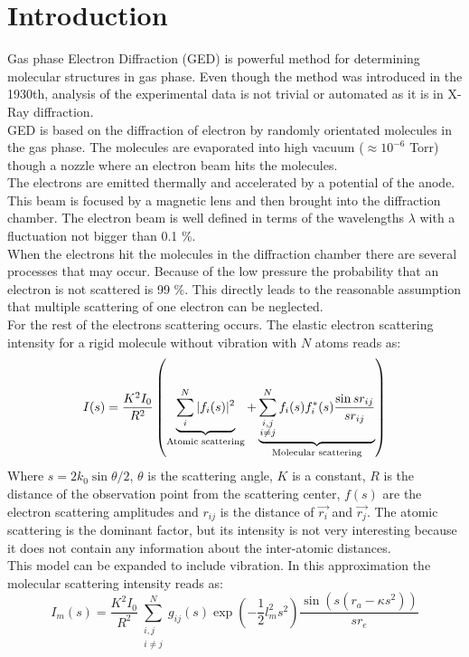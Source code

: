 \section{Introduction}
Gas phase Electron Diffraction  (GED) is powerful method for determining molecular structures in gas phase. Even though the method  was introduced in the 1930th, analysis of the experimental data is not trivial or automated as it is in X-Ray diffraction.\\ 
GED is based on the diffraction of electron by randomly orientated molecules in the gas phase. The molecules are evaporated into high vacuum ($\approx 10^{-6}$ Torr) though a nozzle where an electron beam hits the molecules.\\
The electrons are emitted thermally and accelerated by a potential of the anode.  This beam is focused by a magnetic lens and then brought into the diffraction chamber. The electron beam is well defined in terms of the wavelengths $\lambda$ with a fluctuation not bigger than 0.1 \%. \\
When the electrons hit the molecules in the diffraction chamber there are several processes that may occur. Because of the low pressure the probability that an electron is not scattered is 99 \%. This directly leads to the reasonable assumption that multiple scattering of one electron can be neglected. \\
For the rest of the electrons scattering occurs. The elastic electron scattering intensity for a rigid molecule without vibration with $N$ atoms reads as: 
\begin{equation*}
I(s) = \frac{K^2I_0}{R^2}\left(  \underbrace{\sum_i^N |f_i(s)|^2}_{\textnormal{Atomic scattering}} +  \underbrace{\sum^N_{ \substack{i,j \\ i\neq j}}f_i(s)f_i^*(s) \frac{\sin sr_{ij}}{sr_{ij}}}_{\textnormal{Molecular scattering}} \right)
\end{equation*}
Where $s = 2 k_0 \sin \theta/2$, $\theta$ is the scattering angle, $K$ is a constant, $R$ is the distance of the observation point from the scattering center, $f(s)$ are the electron scattering amplitudes and $r_{ij}$ is the distance of $\vec{r_i}$ and $\vec{r_j}$. The atomic scattering is the dominant factor, but its intensity is not very interesting because it does not contain any information about the inter-atomic distances.  \\
This model can be expanded to include vibration. In this approximation the molecular scattering intensity reads as: 
\begin{equation*}
I_m(s) = \frac{K^2I_0}{R^2} \sum^N_{ \substack{i,j \\ i\neq j}}g_{ij}(s) \exp \left( -\frac{1}{2} l_m^2s^2 \right) \frac{\sin( s(r_a - \kappa s^2))}{sr_e}
\end{equation*}
